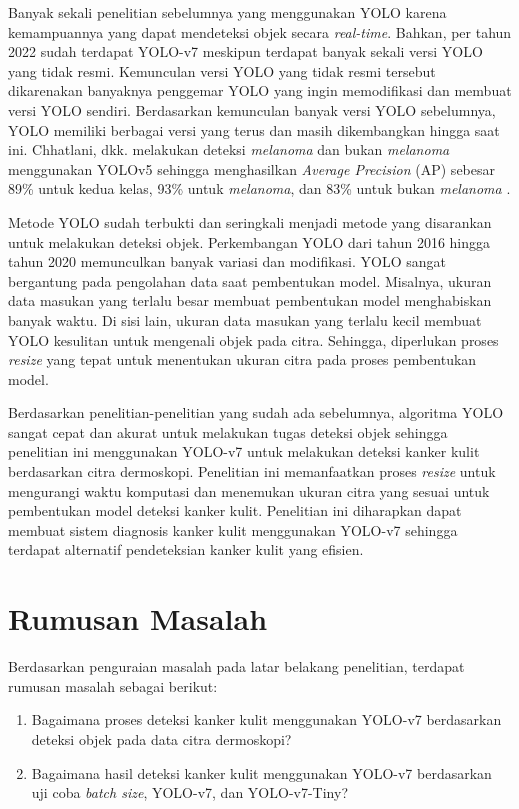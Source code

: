     Banyak sekali penelitian sebelumnya yang menggunakan YOLO karena kemampuannya yang dapat mendeteksi objek secara \textit{real-time}. Bahkan, per tahun 2022 sudah terdapat YOLO-v7 meskipun terdapat banyak sekali versi YOLO yang tidak resmi. Kemunculan versi YOLO yang tidak resmi tersebut dikarenakan banyaknya penggemar YOLO yang ingin memodifikasi dan membuat versi YOLO sendiri. Berdasarkan kemunculan banyak versi YOLO sebelumnya, YOLO memiliki berbagai versi yang terus dan masih dikembangkan hingga saat ini. Chhatlani, dkk. melakukan deteksi \textit{melanoma} dan bukan \textit{melanoma} menggunakan YOLOv5 sehingga menghasilkan \textit{Average Precision} (AP) sebesar 89\% untuk kedua kelas, 93\% untuk \textit{melanoma}, dan 83\% untuk bukan \textit{melanoma} \citep{Chhatlani2022a}.
    
    Metode YOLO sudah terbukti dan seringkali menjadi metode yang disarankan untuk melakukan deteksi objek. Perkembangan YOLO dari tahun 2016 hingga tahun 2020 memunculkan banyak variasi dan modifikasi. YOLO sangat bergantung pada pengolahan data saat pembentukan model. Misalnya, ukuran data masukan yang terlalu besar membuat pembentukan model menghabiskan banyak waktu. Di sisi lain, ukuran data masukan yang terlalu kecil membuat YOLO kesulitan untuk mengenali objek pada citra. Sehingga, diperlukan proses \textit{resize} yang tepat untuk menentukan ukuran citra pada proses pembentukan model.
    
    Berdasarkan penelitian-penelitian yang sudah ada sebelumnya, algoritma YOLO sangat cepat dan akurat untuk melakukan tugas deteksi objek sehingga penelitian ini menggunakan YOLO-v7 untuk melakukan deteksi kanker kulit berdasarkan citra dermoskopi. Penelitian ini memanfaatkan proses \textit{resize} untuk mengurangi waktu komputasi dan menemukan ukuran citra yang sesuai untuk pembentukan model deteksi kanker kulit. Penelitian ini diharapkan dapat membuat sistem diagnosis kanker kulit menggunakan YOLO-v7 sehingga terdapat alternatif pendeteksian kanker kulit yang efisien.

    \section{Rumusan Masalah}
    Berdasarkan penguraian masalah pada latar belakang penelitian, terdapat rumusan masalah sebagai berikut:
    \begin{enumerate}
        \item Bagaimana proses deteksi kanker kulit menggunakan YOLO-v7 berdasarkan deteksi objek pada data citra dermoskopi?
        \item Bagaimana hasil deteksi kanker kulit menggunakan YOLO-v7 berdasarkan uji coba \textit{batch size}, YOLO-v7, dan YOLO-v7-Tiny?
    \end{enumerate}

